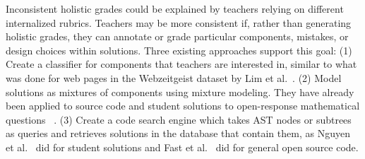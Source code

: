Inconsistent holistic grades could be explained by teachers relying on different internalized rubrics. Teachers may be more consistent if, rather than generating holistic grades, they can annotate or grade particular components, mistakes, or design choices within solutions. Three existing approaches support this goal: (1) Create a classifier for components that teachers are interested in, similar to what was done for web pages in the Webzeitgeist dataset by Lim et al.~\cite{lim2012learning}. (2) Model solutions as mixtures of components using mixture modeling. They have already been applied to source code and student solutions to open-response mathematical questions ~\cite{binkley2014understanding,Linstead}. (3) Create a code search engine which takes AST nodes or subtrees as queries and retrieves solutions in the database that contain them, as Nguyen et al.~\cite{codewebs} did for student solutions and Fast et al.~\cite{codex} did for general open source code.

\begin{comment}
There is a particularly rich literature on Bayesian mixture models. The following methods are particularly relevant to modeling code as mixtures of choices:
\begin{itemize}
\item Latent Dirichlet Allocation (LDA)~\cite{bleiLDA} is a mixture model that is typically applied to natural language. In that context, it learns topics, i.e., distributions over words, as well as the distributions over topics found in each document. %
\item Correlated Topic Models (CTM)~\cite{} are like LDA but topics are no longer assumed to be independent. In other words, the topics learned by the model can be correlated. If it is possible to formulate the inputs such that the learned latent topics represent design decisions, this could capture the reality that design choices are not independent of each other in code composition.
\item Hierarchical Dirichlet Process (HDP) model~\cite{}, like DPMMs, do not require a pre-set number of clusters. Unlike DPMMs, solutions do not belong to a single cluster. Like LDA, solutions contain features, and each feature belongs to a cluster. Solutions can contain features from multiple clusters. This method emulates LDA with no pre-set number of clusters. 
\item Indian Buffet Process (IBP), such as those by \cite{doshi2009indian}, are like HDP but individual features can belong to multiple clusters.
\end{itemize}

\todo{get CTM and HDP citations}
\end{comment}


